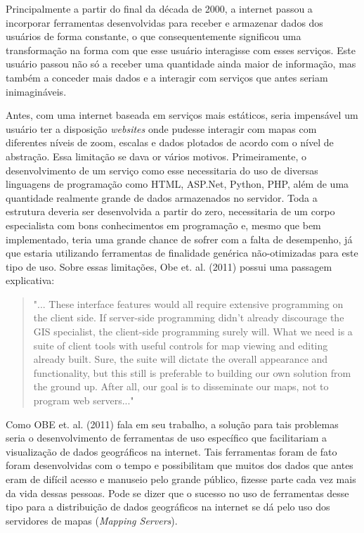 		Principalmente a partir do final da década de 2000, a internet passou a incorporar ferramentas desenvolvidas para receber e armazenar dados dos usuários de forma constante, o que consequentemente significou uma transformação na forma com que esse usuário interagisse com esses serviços. Este usuário passou não só a receber uma quantidade ainda maior de informação, mas também a conceder mais dados e a interagir com serviços que antes seriam inimagináveis.
		
		Antes, com uma internet baseada em serviços mais estáticos, seria impensável um usuário ter a disposição \textit{websites} onde pudesse interagir com mapas com diferentes níveis de zoom, escalas e dados plotados de acordo com o nível de abstração. Essa limitação se dava or vários motivos. Primeiramente, o desenvolvimento de um serviço como esse necessitaria do uso de diversas linguagens de programação como HTML, ASP.Net, Python, PHP, além de uma quantidade realmente grande de dados armazenados no servidor. Toda a estrutura deveria ser desenvolvida a partir do zero, necessitaria de um corpo especialista com bons conhecimentos em programação e, mesmo que bem implementado, teria uma grande chance de sofrer com a falta de desempenho, já que estaria utilizando ferramentas de finalidade genérica não-otimizadas para este tipo de uso. Sobre essas limitações, Obe et. al. (2011) possui uma passagem explicativa:
		
		\begin{quote}
			"... These interface features would all require extensive programming on the client side. If server-side programming didn’t already discourage the GIS specialist, the client-side programming surely will. What we need is a suite of client tools with useful controls for map viewing and editing already built. Sure, the suite will dictate the overall appearance and functionality, but this still is preferable to building our own solution from the ground up. After all, our goal is to disseminate our maps, not to program web servers..."
		\end{quote}
	
		Como OBE et. al. (2011) fala em seu trabalho, a solução para tais problemas seria o desenvolvimento de ferramentas de uso específico que facilitariam a visualização de dados geográficos na internet. Tais ferramentas foram de fato foram desenvolvidas com o tempo e possibilitam que muitos dos dados que antes eram de difícil acesso e manuseio pelo grande público, fizesse parte cada vez mais da vida dessas pessoas. Pode se dizer que o sucesso no uso de ferramentas desse tipo para a distribuição de dados geográficos na internet se dá pelo uso dos servidores de mapas (\textit{Mapping Servers}).
		
